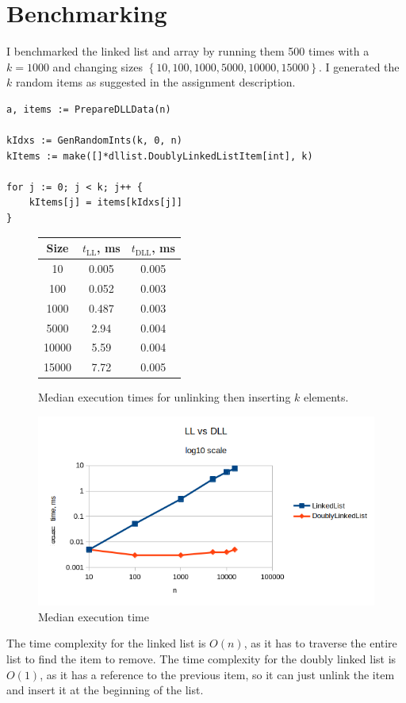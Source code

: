 \documentclass[a4paper,11pt]{article}
\begin{document}
    \section*{Benchmarking}

    I benchmarked the linked list and array by running them 500 times with a $k=1000$ and changing sizes $\left\{10, 100, 1000, 5000, 10000, 15000\right\}$. I generated the $k$ random items as suggested in the assignment description.

    \begin{verbatim}
a, items := PrepareDLLData(n)

kIdxs := GenRandomInts(k, 0, n)
kItems := make([]*dllist.DoublyLinkedListItem[int], k)

for j := 0; j < k; j++ {
    kItems[j] = items[kIdxs[j]]
}
    \end{verbatim}

    \begin{figure}[H]
        \centering
        
        \begin{tabular}{c|c|c}
            Size & $t_\text{LL}$, ms & $t_\text{DLL}$, ms \\
            \hline
            \hline
            10 & 0.005 & 0.005 \\
            \hline
            100 & 0.052 & 0.003 \\
            \hline
            1000 & 0.487 & 0.003 \\
            \hline
            5000 & 2.94 & 0.004 \\
            \hline
            10000 & 5.59 & 0.004 \\
            \hline
            15000 & 7.72 & 0.005 \\
        \end{tabular}

        \caption{Median execution times for unlinking then inserting $k$ elements.}
    \end{figure}

    \begin{figure}[H]
        \centering
        \includegraphics[width=\textwidth]{b3.png}
        \caption{Median execution time}
        \label{fig:b3}
    \end{figure}

    The time complexity for the linked list is $O(n)$, as it has to traverse the entire list to find the item to remove. The time complexity for the doubly linked list is $O(1)$, as it has a reference to the previous item, so it can just unlink the item and insert it at the beginning of the list.
\end{document}
